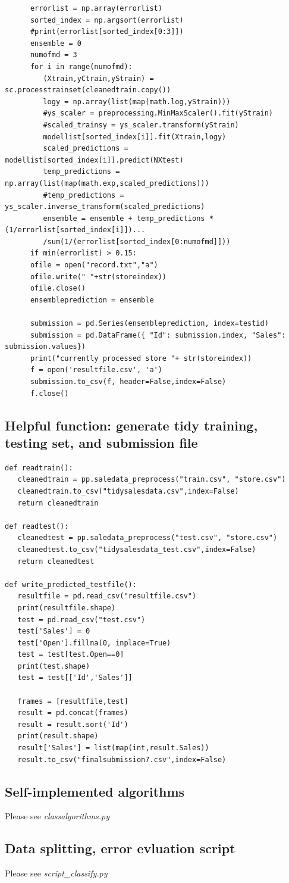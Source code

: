 \documentclass[11pt]{article}
\begin{document}
\begin{verbatim}
      errorlist = np.array(errorlist)
      sorted_index = np.argsort(errorlist)
      #print(errorlist[sorted_index[0:3]])
      ensemble = 0
      numofmd = 3
      for i in range(numofmd):
         (Xtrain,yCtrain,yStrain) = sc.processtrainset(cleanedtrain.copy())
         logy = np.array(list(map(math.log,yStrain)))
         #ys_scaler = preprocessing.MinMaxScaler().fit(yStrain)
         #scaled_trainsy = ys_scaler.transform(yStrain)
         modellist[sorted_index[i]].fit(Xtrain,logy)
         scaled_predictions = modellist[sorted_index[i]].predict(NXtest)
         temp_predictions = np.array(list(map(math.exp,scaled_predictions)))
         #temp_predictions = ys_scaler.inverse_transform(scaled_predictions)
         ensemble = ensemble + temp_predictions * (1/errorlist[sorted_index[i]])...
         /sum(1/(errorlist[sorted_index[0:numofmd]]))
      if min(errorlist) > 0.15:
      ofile = open("record.txt","a")
      ofile.write(" "+str(storeindex))
      ofile.close()
      ensembleprediction = ensemble
      
      submission = pd.Series(ensembleprediction, index=testid)
      submission = pd.DataFrame({ "Id": submission.index, "Sales": submission.values})
      print("currently processed store "+ str(storeindex))
      f = open('resultfile.csv', 'a')
      submission.to_csv(f, header=False,index=False)
      f.close()
\end{verbatim}

\subsection{Helpful function: generate tidy training, testing set, and submission file}

\begin{verbatim}
def readtrain():
   cleanedtrain = pp.saledata_preprocess("train.csv", "store.csv")
   cleanedtrain.to_csv("tidysalesdata.csv",index=False)
   return cleanedtrain

def readtest():
   cleanedtest = pp.saledata_preprocess("test.csv", "store.csv")
   cleanedtest.to_csv("tidysalesdata_test.csv",index=False)
   return cleanedtest

def write_predicted_testfile():
   resultfile = pd.read_csv("resultfile.csv")
   print(resultfile.shape)
   test = pd.read_csv("test.csv")
   test['Sales'] = 0
   test['Open'].fillna(0, inplace=True)
   test = test[test.Open==0]
   print(test.shape)
   test = test[['Id','Sales']]

   frames = [resultfile,test]
   result = pd.concat(frames)
   result = result.sort('Id')
   print(result.shape)
   result['Sales'] = list(map(int,result.Sales))
   result.to_csv("finalsubmission7.csv",index=False)
\end{verbatim}

\subsection{Self-implemented algorithms}
Please see \emph{classalgorithms.py}

\subsection{Data splitting, error evluation script}
Please see \emph{script\_classify.py}
\end{document}
